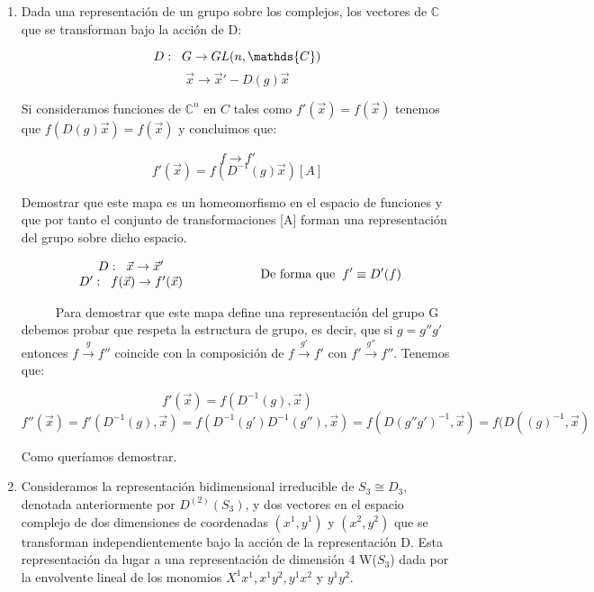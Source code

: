 \documentclass{article}
\begin{document}
\begin{enumerate}
\item Dada una representación de un grupo sobre los complejos, los vectores de $\mathds{C}$ que se transforman bajo la acción de D:

$$D: \hspace{0.2cm} G \to GL(n,\mathds{C})$$
$$\Vec{x}\to \Vec{x}'-D(g)\Vec{x}$$

Si consideramos funciones de $\mathds{C}^n$ en $C$ tales como $f'(\Vec{x})=f(\Vec{x})$ tenemos que $f(D(g)\Vec{x})=f(\Vec{x})$ y concluimos que:

$$f\longrightarrow f'$$
$$f'(\Vec{x})=f(D^{-1}(g)\Vec{x})[A]$$

Demostrar que este mapa es un homeomorfismo en el espacio de funciones y que por tanto el conjunto de transformaciones [A] forman una representación del grupo sobre dicho espacio.

$$\begin{array}{cc}
D: \hspace{0.2cm} \Vec{x}\to \Vec{x}'  \\
D': \hspace{0.2cm} f(\Vec{x})\to f'(\Vec{x})
\end{array} \hspace{2cm} \text{De forma que} \hspace{0.2cm} f'\equiv D'(f)$$

\smallskip
$\hspace{1cm}$ Para demostrar que este mapa define una representación del grupo G debemos probar que respeta la estructura de grupo, es decir, que si $g=g''g'$ entonces $f\overset{g}{\longrightarrow} f''$ coincide con la composición de $f \overset{g'}{\longrightarrow} f'$ con $f'\overset{g''}{\longrightarrow}f''$. Tenemos que:

$$f'(\Vec{x})=f(D^{-1}(g),\Vec{x})$$
$$f''(\Vec{x})=f'(D^{-1}(g), \Vec{x})=f(D^{-1}(g')D^{-1}(g''),\Vec{x
})=f(D(g''g')^{-1},\Vec{x})=f(D((g)^{-1},\Vec{x})$$

Como queríamos demostrar.

\item Consideramos la representación bidimensional irreducible de $S_3 \cong D_3$, denotada anteriormente por $D^{(2)}(S_3)$, y dos vectores en el espacio complejo de dos dimensiones de coordenadas $(x^1,y^1)$ y $(x^2,y^2)$ que se transforman independientemente bajo la acción de la representación D. Esta representación da lugar a una representación de dimensión 4 W($S_3$) dada por la envolvente lineal de los monomios $X^1x^1, x^1y^2,y^1x^2$ y $y^1y^2$.


\end{enumerate}
\end{document}
